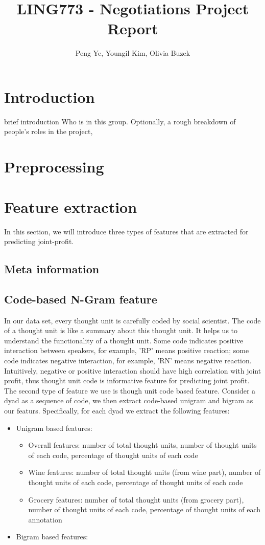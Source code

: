 \documentclass[11pt]{article} %
\title{LING773 - Negotiations Project Report}
\author{Peng Ye, Youngil Kim, Olivia Buzek}
\begin{document}
\maketitle


\section{Introduction}
brief introduction
Who is in this group. Optionally, a rough breakdown of people's roles in the project,
\section{Preprocessing}

\section{Feature extraction}
In this section, we will introduce three types of features that are extracted for predicting joint-profit.
\subsection{Meta information}

\subsection{Code-based N-Gram feature}
In our data set, every thought unit is carefully coded by social scientist. The code of a thought unit is like a summary about this thought unit. It helps us to understand the functionality of a thought unit. Some code indicates positive interaction between speakers, for example, 'RP' means positive reaction; some code indicates negative interaction, for example, 'RN' means negative reaction. Intuitively, negative or positive interaction should have high correlation with joint profit, thus thought unit code is informative feature for predicting joint profit. The second type of feature we use is though unit code based feature. Consider a dyad as a sequence of code, we then extract code-based unigram and bigram as our featurs. Specifically, for each dyad we extract the following features:
\begin{itemize}
\item Unigram based features:
\begin{itemize}
\item Overall features: number of total thought units, number of thought units of each code, percentage of thought units of each code
\item Wine features: number of total thought units (from wine part), number of thought units of each code, percentage of thought units of each code
\item Grocery features: number of total thought units (from grocery part), number of thought units of each code, percentage of thought units of each annotation
\end{itemize}
\item Bigram based features:
\end{itemize}
\end{document}
